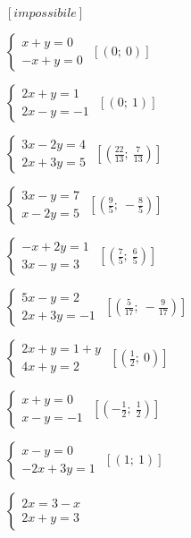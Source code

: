 \begin{esercizio}[*]
\begin{htmulticols}{2}
\begin{enumeratea}
 \hfill \(\left[impossibile\right]\)
 \item \(\left\{\begin{array}{l}x+y=0\\-x+y=0\end{array}\right.\)
 \hfill \(\left[(0;~0)\right]\)
 \item \(\left\{\begin{array}{l}2x+y=1 \\2x-y=-1\end{array}\right.\)
 \hfill \(\left[(0;~1)\right]\)
\item \(\left\{\begin{array}{l}3x-2y=4 \\2x+3y=5\end{array}\right.\)
 \hfill \(\left[\left(\frac{22}{13};~\frac{7}{13}\right)\right]\)
\item \(\left\{\begin{array}{l}3x-y=7 \\x-2y=5 \end{array}\right.\)
 \hfill \(\left[\left(\frac{9}{5};~-\frac{8}{5}\right)\right]\)
\item \(\left\{\begin{array}{l}-x+2y=1 \\3x-y=3\end{array}\right.\)
 \hfill \(\left[\left(\frac{7}{5};~\frac{6}{5}\right)\right]\)
\item \(\left\{\begin{array}{l}5x-y=2\\2x+3y=-1 \end{array}\right.\)
 \hfill \(\left[\left(\frac{5}{17};~-\frac{9}{17}\right)\right]\)
 \item \(\left\{\begin{array}{l}2x+y=1+y\\4x+y=2\end{array}\right.\)
 \hfill \(\left[\left(\frac{1}{2};~0\right)\right]\)
 \item \(\left\{\begin{array}{l}x+y=0\\x-y=-1\end{array}\right.\)
 \hfill \(\left[\left(-{\frac{1}{2}};~\frac{1}{2}\right)\right]\)
 \item \(\left\{\begin{array}{l}x-y=0\\-2x+3y=1\end{array}\right.\)
 \hfill \(\left[(1;~1)\right]\)
 \item \(\left\{\begin{array}{l}2x=3-x\\2x+y=3\end{array}\right.\)

\end{enumeratea}
\end{htmulticols}
\end{esercizio}
